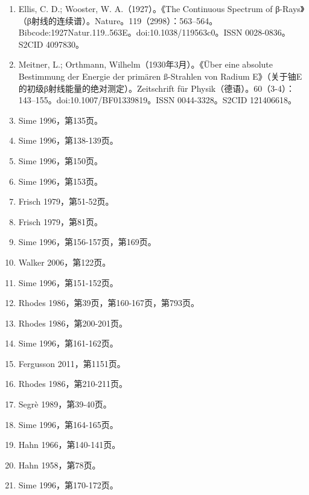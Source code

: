 \begin{enumerate}
\item Ellis, C. D.; Wooster, W. A.（1927）。《The Continuous Spectrum of β-Rays》（β射线的连续谱）。Nature。119（2998）：563–564。Bibcode:1927Natur.119..563E。doi:10.1038/119563c0。ISSN 0028-0836。S2CID 4097830。
\item Meitner, L.; Orthmann, Wilhelm（1930年3月）。《Über eine absolute Bestimmung der Energie der primären ß-Strahlen von Radium E》（关于铀E的初级β射线能量的绝对测定）。Zeitschrift für Physik（德语）。60（3-4）：143–155。doi:10.1007/BF01339819。ISSN 0044-3328。S2CID 121406618。
\item Sime 1996，第135页。
\item Sime 1996，第138-139页。
\item Sime 1996，第150页。
\item Sime 1996，第153页。
\item Frisch 1979，第51-52页。
\item Frisch 1979，第81页。
\item Sime 1996，第156-157页，第169页。
\item Walker 2006，第122页。
\item Sime 1996，第151-152页。
\item Rhodes 1986，第39页，第160-167页，第793页。
\item Rhodes 1986，第200-201页。
\item Sime 1996，第161-162页。
\item Fergusson 2011，第1151页。
\item Rhodes 1986，第210-211页。
\item Segrè 1989，第39-40页。
\item Sime 1996，第164-165页。
\item Hahn 1966，第140-141页。
\item Hahn 1958，第78页。
\item Sime 1996，第170-172页。

\end{enumerate}